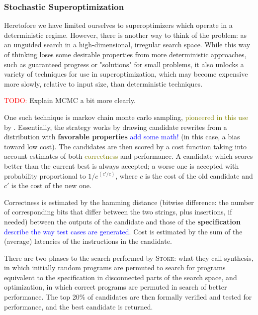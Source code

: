 \documentclass[12pt,twoside]{reedthesis}
\newcommand{\red}[1]{\textcolor{red}{#1}}
\newcommand{\green}[1]{\textcolor{olive}{#1}}
\newcommand{\comment}[2]{\textbf{#1} \textcolor{blue}{#2}}
\newcommand{\addressed}[2]{{#1}}
\begin{document}
\subsubsection{Stochastic Superoptimization}
Heretofore we have limited ourselves to superoptimizers which operate in a deterministic regime.
However, there is another way to think of the problem: as an unguided search in a high-dimensional, irregular search space.
While this way of thinking loses some desirable properties from more deterministic approaches, such as guaranteed progress or "solutions" for small problems, it also unlocks a variety of techniques for use in superoptimization, which may 
    become expensive more slowly, relative to input size, than deterministic techniques.
    
\red{TODO:} Explain MCMC a bit more clearly.
    
One such technique is markov chain monte carlo sampling, \green{pioneered in this use} by \cite{schkufza2013stoke}.
Essentially, the strategy works by drawing candidate rewrites from a distribution with \comment{favorable properties}{add some math!} (in this case, a bias toward low cost).
The candidates are then scored by a cost function taking into account estimates of both \green{correctness} and performance.
A candidate which scores better than the current best is always accepted; a worse one is accepted with probability proportional to $1/e^(c'/c)$, where $c$ is the cost of the old candidate and $c'$ is the cost of the new one.
    
Correctness is estimated by the hamming distance (bitwise difference: the number of corresponding bits that differ between the two strings, plus insertions, if needed) between the outputs of the candidate and those of the
    \comment{specification}{describe the way test cases are generated}.
Cost is estimated by the sum of the (average) latencies of the instructions in the candidate.
    
There are two phases to the search performed by \textsc{Stoke}:
    what they call synthesis, in which initially random programs are permuted to search for programs equivalent to the specification in disconnected parts of the search space,
    and optimization, in which correct programs are permuted in search of better performance.
The top 20\% of candidates are then formally verified and tested for performance, and the best candidate is returned.
    
\end{document}
